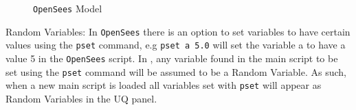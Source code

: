 \begin{figure}[!htbp]
  \caption{\texttt{OpenSees} Model}
  \label{fig:figure3}
\end{figure}


Random Variables: In \texttt{OpenSees} there is an option to set
variables to have certain values using the \texttt{pset} command, e.g
\texttt{pset a 5.0} will set the variable a to have a value 5 in the
\texttt{OpenSees} script. In \texttt{\getsoftwarename{}}, any variable
found in the main script to be set using the \texttt{pset} command
will be assumed to be a Random Variable. As such, when a new main
script is loaded all variables set with \texttt{pset} will appear as
Random Variables in the UQ panel.
